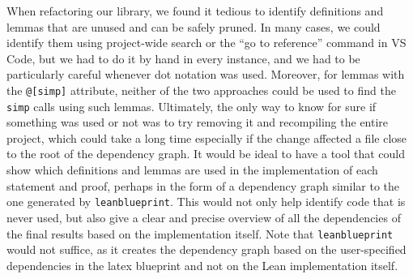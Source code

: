 When refactoring our library, we found it tedious to identify definitions and lemmas that are unused and can be safely pruned. In many cases, we could identify them using project-wide search or the ``go to reference'' command in VS Code, but we had to do it by hand in every instance, and we had to be particularly careful whenever dot notation was used. Moreover, for lemmas with the \texttt{@[simp]} attribute, neither of the two approaches could be used to find the \texttt{simp} calls using such lemmas. Ultimately, the only way to know for sure if something was used or not was to try removing it and recompiling the entire project, which could take a long time especially if the change affected a file close to the root of the dependency graph. It would be ideal to have a tool that could show which definitions and lemmas are used in the implementation of each statement and proof, perhaps in the form of a dependency graph similar to the one generated by \texttt{leanblueprint}. This would not only help identify code that is never used, but also give a clear and precise overview of all the dependencies of the final results based on the implementation itself. Note that \texttt{leanblueprint} would not suffice, as it creates the dependency graph based on the user-specified dependencies in the latex blueprint and not on the Lean implementation itself.


